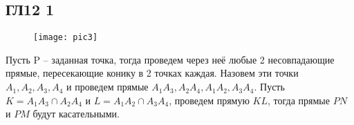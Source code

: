 \subsection*{ГЛ12 1}
\begin{figure}[h]
	\texttt{[image: pic3]}
\end{figure}
Пусть P -- заданная точка, тогда проведем через неё любые 2 несовпадающие прямые, пересекающие конику в 2 точках каждая. Назовем эти точки $A_1, A_2, A_3, A_4$ и проведем прямые $A_1A_3, A_2A_4, A_1A_2, A_3A_4$. Пусть $K = A_1A_3 \cap A_2A_4$ и $L = A_1A_2 \cap A_3A_4$, проведем прямую $KL$, тогда прямые $PN$ и $PM$ будут касательными.
		